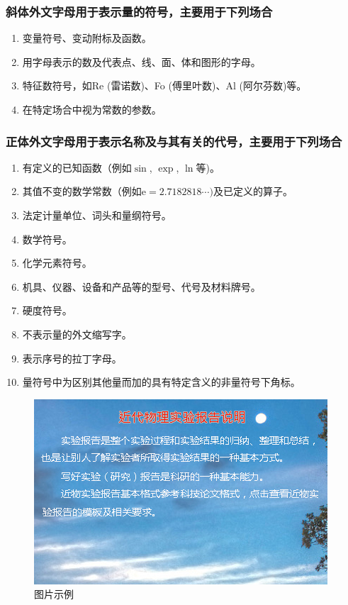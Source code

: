 \documentclass{thuemp}
\begin{document}
\subsubsection{斜体外文字母用于表示量的符号，主要用于下列场合}

\begin{enumerate}
\renewcommand{\labelenumi}{(\theenumi)}
\item 变量符号、变动附标及函数。
\item 用字母表示的数及代表点、线、面、体和图形的字母。
\item 特征数符号，如Re (雷诺数)、Fo (傅里叶数)、Al (阿尔芬数)等。
\item 在特定场合中视为常数的参数。
\end{enumerate} 

\subsubsection{正体外文字母用于表示名称及与其有关的代号，主要用于下列场合}
\begin{enumerate}
\renewcommand{\labelenumi}{(\theenumi)}
\item 有定义的已知函数（例如$\sin$, $\exp$, $\ln$等)。
\item 其值不变的数学常数（例如$\mathrm{e} = 2.718 281 8\cdots)$及已定义的算子。
\item 法定计量单位、词头和量纲符号。
\item 数学符号。
\item 化学元素符号。
\item 机具、仪器、设备和产品等的型号、代号及材料牌号。
\item 硬度符号。
\item 不表示量的外文缩写字。
\item 表示序号的拉丁字母。
\item 量符号中为区别其他量而加的具有特定含义的非量符号下角标。
\end{enumerate} 
\begin{figure}[H]
	\centering
	\includegraphics[width=0.8\linewidth]{./image/example.jpg}
	\caption{图片示例} \label{fig:eg}
\end{figure}
\end{document}
